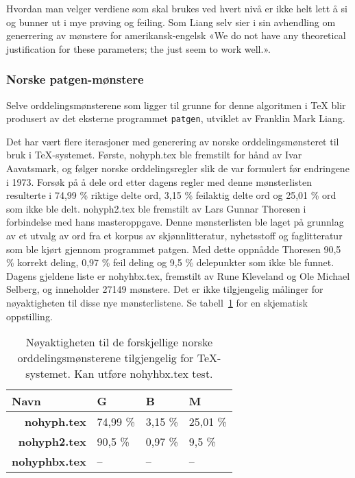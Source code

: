 Hvordan man velger verdiene som skal brukes ved hvert nivå er ikke helt lett å si og bunner ut i mye prøving og feiling. Som Liang selv sier i sin avhendling om generrering av mønstere for amerikansk-engelsk «We do not have any theoretical justification for these parameters; the just seem to work well.»\cite{liang1983word}. 

\subsubsection{Norske patgen-mønstere}

Selve orddelingsmønsterene som ligger til grunne for denne algoritmen i \TeX{} blir produsert av det eksterne programmet \texttt{patgen}, utviklet av Franklin Mark Liang\cite{liang1983word}. 

Det har vært flere iterasjoner med generering av norske orddelingsmønsteret til bruk i \TeX{}-systemet. Første, nohyph.tex ble fremstilt for hånd av Ivar Aavatsmark, og følger norske orddelingsregler slik de var formulert før endringene i 1973\cite{nohyphbx, thoresen1993virtuelle}. Forsøk på å dele ord etter dagens regler med denne mønsterlisten resulterte i  74,99 \% riktige delte ord, 3,15 \% feilaktig delte ord og 25,01 \% ord som ikke ble delt\cite{thoresen1993virtuelle}. nohyph2.tex ble fremstilt av Lars Gunnar Thoresen i forbindelse med hans masteroppgave\cite{thoresen1993virtuelle}. Denne mønsterlisten ble laget på grunnlag av et utvalg av ord fra et korpus av skjønnlitteratur, nyhetsstoff og faglitteratur som ble kjørt gjennom programmet patgen. Med dette oppnådde Thoresen 90,5 \% korrekt deling, 0,97 \% feil deling og 9,5 \% delepunkter som ikke ble funnet. Dagens gjeldene liste er nohyhbx.tex, fremstilt av Rune Kleveland og Ole Michael Selberg\cite{nohyphbx}, og inneholder 27149 mønstere. Det er ikke tilgjengelig målinger for nøyaktigheten til disse nye mønsterlistene. Se tabell~\ref{tab:patterns} for en skjematisk oppstilling.

\begin{table}[h]
\centering
\begin{tabular}{|r|l|l|l|}
\hline
\multicolumn{1}{|l|}{\textbf{Navn}} & \textbf{G} & \textbf{B} & \textbf{M} \\ \hline
\textbf{nohyph.tex}                 & 74,99 \%   & 3,15 \%    & 25,01 \%   \\ \hline
\textbf{nohyph2.tex}                & 90,5 \%    & 0,97 \%    & 9,5 \%     \\ \hline
\textbf{nohyphbx.tex}               & --         & --         & --         \\ \hline
\end{tabular}
\caption{Nøyaktigheten til de forskjellige norske orddelingsmønsterene tilgjengelig for \TeX{}-systemet. Kan utføre nohyhbx.tex test.}
\label{tab:patterns}
\end{table}

